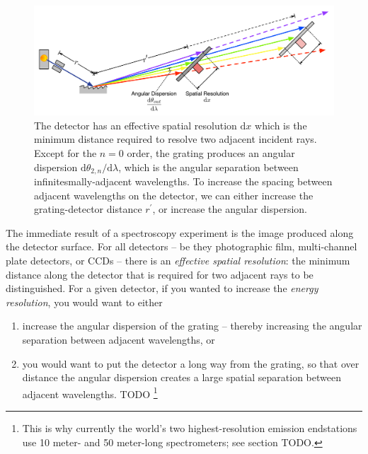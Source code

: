 \begin{figure}[htbp] %
   \centering
   \includegraphics[scale=0.6]{../data/Chapter1/1f_spectrometerResolution/1f_2.pdf} 
   \caption[The spectrometer detector has an effective spatial resolution $\mathrm{d}x$ which is the minimum distance required to resolve two adjacent incident rays. To increase the spacing between adjacent wavelengths on the detector, we can either increase the grating-detector distance $r^\prime$, or increase the angular dispersion.]{The detector has an effective spatial resolution $\mathrm{d}x$ which is the minimum distance required to resolve two adjacent incident rays.  Except for the $n=0$ order, the grating produces an angular dispersion $\mathrm{d}\theta_{2,n}/\mathrm{d}\lambda$, which is the angular separation between infinitesmally-adjacent wavelengths.  To increase the spacing between adjacent wavelengths on the detector, we can either increase the grating-detector distance $r^\prime$, or increase the angular dispersion. }
   \label{1f}
\end{figure}
               
The immediate result of a spectroscopy experiment is the image produced along the detector surface.  For all detectors -- be they photographic film, multi-channel plate detectors, or CCDs -- there is an \emph{effective spatial resolution}: the minimum distance along the detector that is required for two adjacent rays to be distinguished.  For a given detector, if you wanted to increase the \emph{energy resolution}, you would want to either 
\begin{enumerate}
\item increase the angular dispersion of the grating -- thereby increasing the angular separation between adjacent wavelengths, or 
\item you would want to put the detector a long way from the grating, so that over distance the angular dispersion creates a large spatial separation between adjacent wavelengths.
TODO \footnote{This is why currently the world's two highest-resolution emission endstations use 10 meter- and 50 meter-long spectrometers; see section TODO.}
\end{enumerate}

